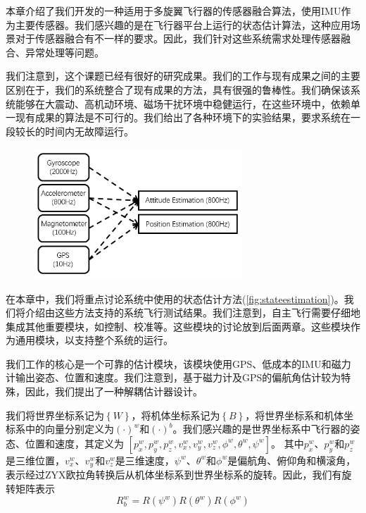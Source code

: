 \documentclass[
  type=master
]{gdutthesis}
\begin{document}


本章介绍了我们开发的一种适用于多旋翼飞行器的传感器融合算法，使用IMU作为主要传感器。我们感兴趣的是在飞行器平台上运行的状态估计算法，这种应用场景对于传感器融合有不一样的要求。因此，我们针对这些系统需求处理传感器融合、异常处理等问题。

我们注意到，这个课题已经有很好的研究成果\cite{mahony2008nonlinear,hua2010attitude,khosravian2016state}。我们的工作与现有成果之间的主要区别在于，我们的系统整合了现有成果的方法，具有很强的鲁棒性。我们确保该系统能够在大震动、高机动环境、磁场干扰环境中稳健运行，在这些环境中，依赖单一现有成果的算法是不可行的。我们给出了各种环境下的实验结果，要求系统在一段较长的时间内无故障运行。
\begin{figure}[htbp]
	\centering
	\includegraphics[width=0.7\textwidth]{state estimation.png}
	\label{fig:stateestimation}
\end{figure} 

在本章中，我们将重点讨论系统中使用的状态估计方法(\autoref{fig:stateestimation})。我们将介绍由这些方法支持的系统飞行测试结果。我们注意到，自主飞行需要仔细地集成其他重要模块，如控制、校准等。这些模块的讨论放到后面两章。这些模块作为通用模块，以支持整个系统的运行。

我们工作的核心是一个可靠的估计模块，该模块使用GPS、低成本的IMU和磁力计输出姿态、位置和速度。我们注意到，基于磁力计及GPS的偏航角估计较为特殊，因此，我们提出了一种解耦估计器设计。

我们将世界坐标系记为$\left\{ W \right\}$，将机体坐标系记为$\left\{ B \right\}$，将世界坐标系和机体坐标系中的向量分别定义为$(\cdot)^w$和$(\cdot)^b$。我们感兴趣的是世界坐标系中飞行器的姿态、位置和速度，其定义为
$[p^w_x , p^w_y , p^w_z , v^w_x , v^w_y , v^w_z , \phi^w , \theta^w , \psi^w]$。
其中$p^w_x$、$p^w_y$和$p^w_z$是三维位置，$v^w_x$、$v^w_y$和$v^w_z$是三维速度，$\psi^w$、$\theta^w$和$\phi^w$是偏航角、俯仰角和横滚角，表示经过ZYX欧拉角转换后从机体坐标系到世界坐标系的旋转。因此，我们有旋转矩阵表示
\begin{equation}\label{eq:rotationmatrix}
	R_{b}^{w}=R(\psi^w)R(\theta^w)R(\phi^w)
\end{equation}
\end{document}
